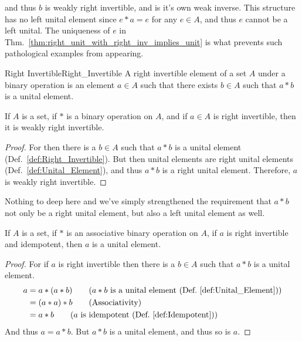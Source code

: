     and thus $b$ is weakly right invertible, and is it's own weak inverse. This
    structure has no left unital element since $e*a=e$ for any $e\in{A}$, and
    thus $e$ cannot be a left unital. The uniqueness of $e$ in
    Thm.~\ref{thm:right_unit_with_right_inv_implies_unit} is what prevents such
    pathological examples from appearing.
    \begin{fdefinition}{Right Invertible}{Right_Invertible}
        A right invertible element of a \gls{set} $A$ under a
        \gls{binary operation} is an element $a\in{A}$ such that there exists
        $b\in{A}$ such that $a*b$ is a \gls{unital element}.
    \end{fdefinition}
    \begin{theorem}
        \label{thm:r_inv_implies_weak_r_inv}%
        If $A$ is a set, if $*$ is a binary operation on $A$, and if $a\in{A}$
        is right invertible, then it is weakly right invertible.
    \end{theorem}
    \begin{proof}
        For then there is a $b\in{A}$ such that $a*b$ is a unital element
        (Def.~\ref{def:Right_Invertible}). But then unital elements are
        right unital elements (Def.~\ref{def:Unital_Element}), and thus $a*b$
        is a right unital element. Therefore, $a$ is weakly right invertible.
    \end{proof}
    Nothing to deep here and we've simply strengthened the requirement that
    $a*b$ not only be a right unital element, but also a left unital element as
    well.
    \begin{theorem}
        \label{thm:assoc_right_idem_inv_is_unit}%
        If $A$ is a set, if $*$ is an associative binary operation on $A$, if
        $a$ is right invertible and idempotent, then $a$ is a unital element.
    \end{theorem}
    \begin{proof}
        For if $a$ is right invertible then there is a $b\in{A}$ such that
        $a*b$ is a unital element.
        \begin{align}
            a&=a*(a*b)
            \tag{$a*b$ is a unital element (Def.~\ref{def:Unital_Element})}\\
            &=(a*a)*b
            \tag{Associativity}\\
            &=a*b
            \tag{$a$ is idempotent (Def.~\ref{def:Idempotent})}
        \end{align}
        And thus $a=a*b$. But $a*b$ is a unital element, and thus so is $a$.
    \end{proof}

